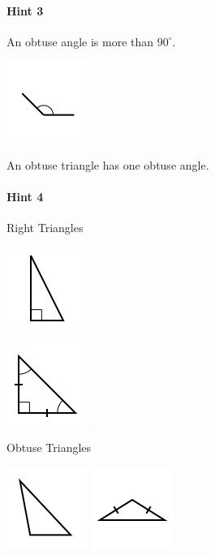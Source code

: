 \documentclass[twocolumn,10pt]{article}
\def\shrinkfactor{0.55}
\begin{document}
\paragraph{Hint 3}An obtuse angle is more than $90 ^\circ$.

\includegraphics[scale=\shrinkfactor]{figures/3b29cb7bd47c46eb2ecd140dd305d1123b9185e6.png}

An obtuse triangle has one obtuse angle.

\paragraph{Hint 4}Right Triangles


\includegraphics[scale=\shrinkfactor]{figures/ac56df552ee790942f862b76d637a69c2180f1d4.png}

\includegraphics[scale=\shrinkfactor]{figures/8837c2c90c5edbd24cdce3fa7e110370dd5dcdef.png}

Obtuse Triangles


\includegraphics[scale=\shrinkfactor]{figures/2d844a51b839d81f30ea0fd7869869c78159abd0.png} 
\includegraphics[scale=\shrinkfactor]{figures/ab33a8ea9f6040b7277f725f46c6d9452ab8fbbc.png}
\end{document}
